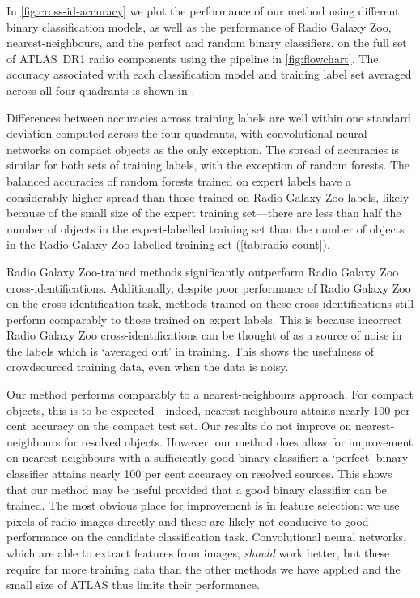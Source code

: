     In \autoref{fig:cross-id-accuracy} we plot the performance {of our
    method using different binary classification models}, as well as the
    performance of Radio Galaxy Zoo, nearest-neighbours, and the perfect and
    random binary classifiers, on the full set of ATLAS~DR1 radio components
    using the pipeline in \autoref{fig:flowchart}. The accuracy
    {associated with each classification model} and training label set
    averaged across all four quadrants is shown in .

    Differences between accuracies across training labels are well within one
    standard deviation computed across the four quadrants, with convolutional
    neural networks on compact objects as the only exception. The spread of
    accuracies is similar for both sets of training labels, with the exception
    of random forests. The balanced accuracies of random forests trained on
    expert labels have a considerably higher spread than those trained on
    Radio Galaxy Zoo labels, likely because of the small size of the expert
    training set---there are less than half the number of objects in the
    expert-labelled training set than the number of objects in the Radio
    Galaxy Zoo-labelled training set (\autoref{tab:radio-count}).

    Radio Galaxy Zoo-trained methods significantly outperform Radio Galaxy Zoo
    cross-identifications. Additionally, despite poor performance of Radio
    Galaxy Zoo on the cross-identification task, methods trained on these
    cross-identifications still perform comparably to those trained on expert
    labels. This is because incorrect Radio Galaxy Zoo cross-identifications
    can be thought of as a source of noise in the labels which is `averaged out'
    in training. This shows the usefulness of crowdsourced training data, even
    when the data is noisy.

    Our method performs comparably to a nearest-neighbours approach. For
    compact objects, this is to be expected---indeed, nearest-neighbours
    attains nearly 100 per cent accuracy on the compact test set. Our results
    do not improve on nearest-neighbours for resolved objects. However, our
    method does allow for improvement on nearest-neighbours with a
    sufficiently good binary classifier: a `perfect' binary classifier attains
    nearly 100 per cent accuracy on resolved sources. This shows that our
    method may be useful provided that a good binary classifier can be
    trained. The most obvious place for improvement is in feature selection:
    we use pixels of radio images directly and these are likely not conducive
    to good performance on the candidate classification task. Convolutional
    neural networks, which are able to extract features from images,
    \emph{should} work better, but these require far more training data than
    the other methods we have applied and the small size of ATLAS thus limits their performance.

